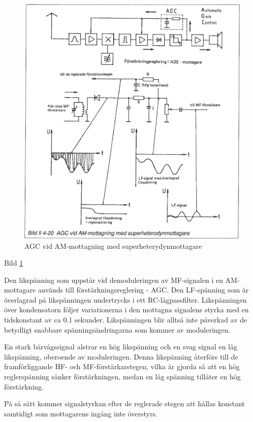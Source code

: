 \begin{figure}
  \includegraphics[width=\textwidth]{images/bild_2_4-20}
  \caption{AGC vid AM-mottagning med superheterydynmottagare}
  \label{fig:bildII4-20}
\end{figure}

Bild \ref{fig:bildII4-20}

Den likspänning som uppstår vid demoduleringen av MF-signalen i en
AM-mottagare används till förstärkningsreglering - AGC.  Den
LF-spänning som är överlagrad på likspänningen undertrycks i ett
RC-lågpassfilter. Likspänningen över kondensatorn följer variationerna
i den mottagna signalens styrka med en tidskonstant av ca 0.1
sekunder. Likspänningen blir alltså inte påverkad av de betydligt
snabbare spänningsändringarna som kommer av moduleringen.

En stark bärvågssignal alstrar en hög likspänning och en svag signal
en låg likspänning, oberoende av moduleringen.  Denna likspänning
återförs till de framförliggande HF- och MF-förstärkarstegen, vilka är
gjorda så att en hög reglerspänning sänker förstärkningen, medan en
låg spänning tillåter en hög förstärkning.

På så sätt kommer signalstyrkan efter de reglerade stegen att hållas
konstant samtidigt som mottagarens ingång inte överstyrs.

